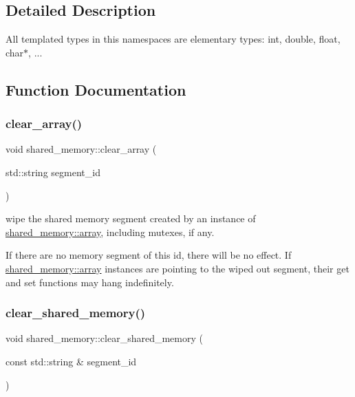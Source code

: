 \subsection{Detailed Description}
All templated types in this namespaces are elementary types\+: int, double, float, char$\ast$, ... 

\subsection{Function Documentation}
\mbox{\label{namespaceshared__memory_a0371eb6089f446098adf2f9c106333dc}} 
\subsubsection{\texorpdfstring{clear\+\_\+array()}{clear\_array()}}
{\footnotesize\ttfamily void shared\+\_\+memory\+::clear\+\_\+array (\begin{DoxyParamCaption}\item[{std\+::string}]{segment\+\_\+id }\end{DoxyParamCaption})}



wipe the shared memory segment created by an instance of \hyperlink{classshared__memory_1_1array}{shared\+\_\+memory\+::array}, including mutexes, if any. 

If there are no memory segment of this id, there will be no effect. If \hyperlink{classshared__memory_1_1array}{shared\+\_\+memory\+::array} instances are pointing to the wiped out segment, their get and set functions may hang indefinitely. \mbox{\label{namespaceshared__memory_aa8583540879db53fc80b31410b5eec68}} 
\subsubsection{\texorpdfstring{clear\+\_\+shared\+\_\+memory()}{clear\_shared\_memory()}}
{\footnotesize\ttfamily void shared\+\_\+memory\+::clear\+\_\+shared\+\_\+memory (\begin{DoxyParamCaption}\item[{const std\+::string \&}]{segment\+\_\+id }\end{DoxyParamCaption})}



